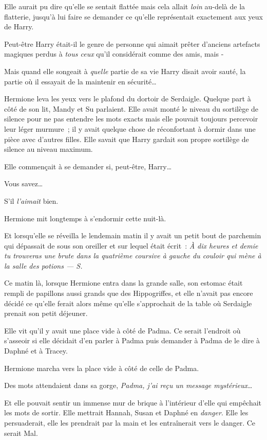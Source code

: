 Elle aurait pu dire qu'elle se sentait flattée mais cela allait \emph{loin} au-delà de la flatterie, jusqu'à lui faire se demander ce qu'elle représentait exactement aux yeux de Harry.

Peut-être Harry était-il le genre de personne qui aimait prêter d'anciens artefacts magiques perdus à \emph{tous ceux} qu'il considérait comme des amis, mais -

Mais quand elle songeait à \emph{quelle} partie de sa vie Harry disait avoir sauté, la partie où il essayait de la maintenir en sécurité…

Hermione leva les yeux vers le plafond du dortoir de Serdaigle. Quelque part à côté de son lit, Mandy et Su parlaient. Elle avait monté le niveau du sortilège de silence pour ne pas entendre les mots exacts mais elle pouvait toujours percevoir leur léger murmure~; il y avait quelque chose de réconfortant à dormir dans une pièce avec d'autres filles. Elle savait que Harry gardait son propre sortilège de silence au niveau maximum.

Elle commençait à se demander si, peut-être, Harry…

Vous savez…

S'il \emph{l'aimait} bien.

Hermione mit longtemps à s'endormir cette nuit-là.

Et lorsqu'elle se réveilla le lendemain matin il y avait un petit bout de parchemin qui dépassait de sous son oreiller et sur lequel était écrit~: \emph{À dix heures et demie tu trouveras une brute dans la quatrième coursive à gauche du couloir qui mène à la salle des potions — S.}

\later

Ce matin là, lorsque Hermione entra dans la grande salle, son estomac était rempli de papillons aussi grands que des Hippogriffes, et elle n'avait pas encore décidé ce qu'elle ferait alors même qu'elle s'approchait de la table où Serdaigle prenait son petit déjeuner.

Elle vit qu'il y avait une place vide à côté de Padma. Ce serait l'endroit où s'asseoir si elle décidait d'en parler à Padma puis demander à Padma de le dire à Daphné et à Tracey.

Hermione marcha vers la place vide à côté de celle de Padma.

Des mots attendaient dans sa gorge, \emph{Padma, j'ai reçu un message mystérieux}…

Et elle pouvait sentir un immense mur de brique à l'intérieur d'elle qui empêchait les mots de sortir. Elle mettrait Hannah, Susan et Daphné en \emph{danger}. Elle les persuaderait, elle les prendrait par la main et les entraînerait vers le danger. Ce serait Mal.

